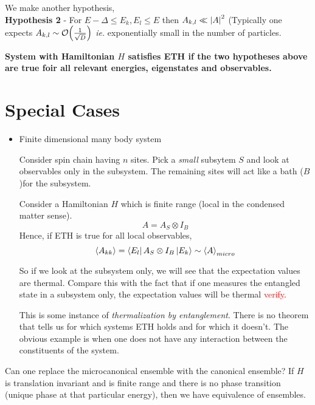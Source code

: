 \documentclass[a4paper,11pt]{article}
\begin{document}
We make another hypothesis,\\
\textbf{Hypothesis 2} - For $E-\Delta \le E_k, E_l \le E$ then $A_{k,l} \ll \abs{A}^2$ (Typically one expects $A_{k,l} \sim \order{\frac{1}{\sqrt{D}}}$ \textit{ie.} exponentially small in the number of particles.

\textbf{System with Hamiltonian $H$ satisfies ETH if the two hypotheses above are true foir all relevant energies, eigenstates and observables. }

\section{Special Cases}

\begin{itemize}
	\item Finite dimensional many body system
	
	Consider spin chain having $n$ sites. Pick a \textit{small} subsytem $S$ and look at observables only in the subsystem. The remaining sites will act like a bath ($B$)for the subsystem.
	
	Consider a Hamiltonian $H$ which is finite range (local in the condensed matter sense). $$A = A_S \otimes I_B$$
	Hence, if ETH is true for all local observables,
	$$\expval{A_{kk}} = \bra{E_l}A_S \otimes I_B \ket{E_k} \sim \expval{A}_{micro}$$
	
	So if we look at the subsystem only, we will see that the expectation values are thermal. Compare this with the fact that if one measures the entangled state in a subsystem only, the expectation values will be thermal  \textcolor{red}{verify}. 
	
	This is some instance of \textit{thermalization by entanglement}. There is no theorem that tells us for which systems ETH holds and for which it doesn't. The obvious example is when one does not have any interaction between the constituents of the system.
\end{itemize}

Can one replace the microcanonical ensemble with the canonical ensemble? If $H$ is translation invariant and is finite range and there is no phase transition (unique phase at that particular energy), then we have equivalence of ensembles.
\end{document}
